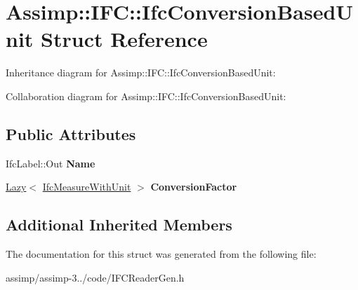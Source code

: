 \hypertarget{struct_assimp_1_1_i_f_c_1_1_ifc_conversion_based_unit}{\section{Assimp\+:\+:I\+F\+C\+:\+:Ifc\+Conversion\+Based\+Unit Struct Reference}
\label{struct_assimp_1_1_i_f_c_1_1_ifc_conversion_based_unit}
}


Inheritance diagram for Assimp\+:\+:I\+F\+C\+:\+:Ifc\+Conversion\+Based\+Unit\+:


Collaboration diagram for Assimp\+:\+:I\+F\+C\+:\+:Ifc\+Conversion\+Based\+Unit\+:
\subsection*{Public Attributes}
\begin{DoxyCompactItemize}
\item 
\hypertarget{struct_assimp_1_1_i_f_c_1_1_ifc_conversion_based_unit_aad754fac9062d7e8c482c21e7dbeb543}{Ifc\+Label\+::\+Out {\bfseries Name}}\label{struct_assimp_1_1_i_f_c_1_1_ifc_conversion_based_unit_aad754fac9062d7e8c482c21e7dbeb543}

\item 
\hypertarget{struct_assimp_1_1_i_f_c_1_1_ifc_conversion_based_unit_a582c0eb2e34cafb6970b63c42b754627}{\hyperlink{struct_assimp_1_1_s_t_e_p_1_1_lazy}{Lazy}$<$ \hyperlink{struct_assimp_1_1_i_f_c_1_1_ifc_measure_with_unit}{Ifc\+Measure\+With\+Unit} $>$ {\bfseries Conversion\+Factor}}\label{struct_assimp_1_1_i_f_c_1_1_ifc_conversion_based_unit_a582c0eb2e34cafb6970b63c42b754627}

\end{DoxyCompactItemize}
\subsection*{Additional Inherited Members}


The documentation for this struct was generated from the following file\+:\begin{DoxyCompactItemize}
\item 
assimp/assimp-\/3../code/I\+F\+C\+Reader\+Gen.\+h\end{DoxyCompactItemize}
